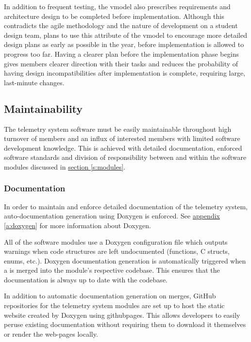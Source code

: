 In addition to frequent testing, the \gls{vmodel} also prescribes requirements and architecture design to be completed
before implementation. Although this contradicts the \gls{agile} methodology and the nature of development on a student
design team,  plans to use this attribute of the \gls{vmodel} to encourage more detailed design
plans as early as possible in the year, before implementation is allowed to progress too far. Having a clearer plan
before the implementation phase begins gives members clearer direction with their tasks and reduces the probability of
having design incompatibilities after implementation is complete, requiring large, last-minute changes.

\subsection{Maintainability}

The  telemetry system software must be easily maintainable throughout high turnover of members
and an influx of interested members with limited software development knowledge. This is achieved with detailed
documentation, enforced software standards and division of responsibility between and within the software modules
discussed in \hyperref[s:modules]{section \ref{s:modules}}.

\subsubsection{Documentation}

In order to maintain and enforce detailed documentation of the telemetry system, auto-documentation generation using
Doxygen is enforced. See \hyperref[a:doxygen]{appendix \ref{a:doxygen}} for more information about Doxygen.

All of the software modules use a Doxygen configuration file which outputs warnings when code structures are left
undocumented (functions, C structs, enums, etc.). Doxygen documentation generation is automatically triggered when a
 is merged into the module's respective codebase. This ensures that the documentation is always up to
date with the codebase.

In addition to automatic documentation generation on merges, GitHub repositories for the telemetry system modules are
set up to host the static  website created by Doxygen using \gls{githubpages}. This allows developers
to easily peruse existing documentation without requiring them to download it themselves or render the web-pages
locally.

